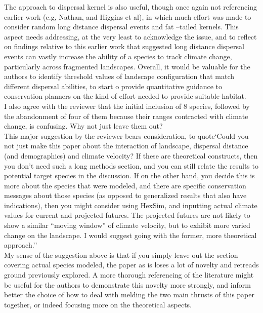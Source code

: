 \documentclass[12pt,pdftex]{article}
\begin{document}
The approach to dispersal kernel is also useful, though once again not referencing earlier work (e.g, Nathan, and Higgins et al), in which much effort was made to consider random long distance dispersal events and fat –tailed kernels. This aspect needs addressing, at the very least to acknowledge the issue, and to reflect on findings relative to this earlier work that suggested long distance dispersal events can vastly increase the ability of a species to track climate change, particularly across fragmented landscapes. Overall, it would be valuable for the authors to identify threshold values of landscape configuration that match different dispersal abilities, to start o provide quantitative guidance to conservation planners on the kind of effort needed to provide suitable habitat.\\

I also agree with the reviewer that the initial inclusion of 8 species, followed by the abandonment of four of them because their ranges contracted with climate change, is confusing. Why not just leave them out? \\

This major suggestion by the reviewer bears consideration, to quote`Could you not just make this paper about the interaction of landscape, dispersal distance (and demographics) and climate velocity? If these are theoretical constructs, then you don’t need such a long methods section, and you can still relate the results to potential target species in the discussion. If on the other hand, you decide this is more about the species that were modeled, and there are specific conservation messages about those species (as opposed to generalized results that also have indications), then you might consider using HexSim, and inputting actual climate values for current and projected futures. The projected futures are not likely to show a similar “moving window” of climate velocity, but to exhibit more varied change on the landscape. I would suggest going with the former, more theoretical approach.''\\

My sense of the suggestion above is that if you simply leave out the section covering actual species modeled, the paper as is loses a lot of novelty and retreads ground previously explored. A more thorough referencing of the literature might be useful for the authors to demonstrate this novelty more strongly, and inform better the choice of how to deal with melding the two main thrusts of this paper together, or indeed focusing more on the theoretical aspects. \\
\end{document}
